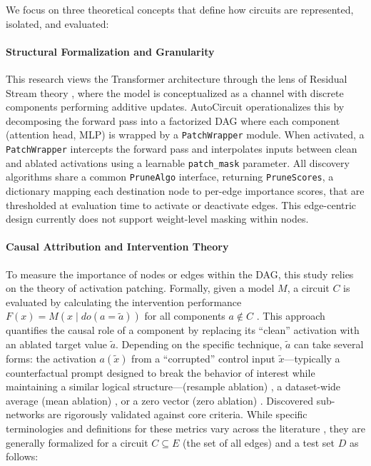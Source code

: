 \documentclass[
    IMRAD=false,
	english,
	ruledheaders=section, %
	class=report, %
	thesis={type=bachelor}, %
	accentcolor=9c, %
	custommargins=false,%
	marginpar=false,%
	parskip=half,%
	fontsize=11pt,%
]{tudapub}
\begin{document}

We focus on three theoretical concepts that define how circuits are represented, isolated, and evaluated:

\paragraph{Structural Formalization and Granularity} This research views the Transformer architecture through the lens of Residual Stream theory \citep{elhage2021mathematical}, where the model is conceptualized as a channel with discrete components performing additive updates. AutoCircuit \citep{miller2024transformer} operationalizes this by decomposing the forward pass into a factorized DAG where each component (attention head, MLP) is wrapped by a \texttt{PatchWrapper} module. When activated, a \texttt{PatchWrapper} intercepts the forward pass and interpolates inputs between clean and ablated activations using a learnable \texttt{patch\_mask} parameter. All discovery algorithms share a common \texttt{PruneAlgo} interface, returning \texttt{PruneScores}, a dictionary mapping each destination node to per-edge importance scores, that are thresholded at evaluation time to activate or deactivate edges. This edge-centric design currently does not support weight-level masking within nodes.

\paragraph{Causal Attribution and Intervention Theory} To measure the importance of nodes or edges within the DAG, this study relies on the theory of activation patching. Formally, given a model $M$, a circuit $C$ is evaluated by calculating the intervention performance $F(x) = M(x \mid do(a = \tilde{a}))$ for all components $a \notin C$ \citep{miller2024transformer}. This approach quantifies the causal role of a component by replacing its ``clean'' activation with an ablated target value $\tilde{a}$. Depending on the specific technique, $\tilde{a}$ can take several forms: the activation $a(\tilde{x})$ from a ``corrupted'' control input $\tilde{x}$—typically a counterfactual prompt designed to break the behavior of interest while maintaining a similar logical structure---(resample ablation) \citep{meng2022locating}, a dataset-wide average (mean ablation) \citep{wang2023interpretability}, or a zero vector (zero ablation) \citep{olsson2022context}. Discovered sub-networks are rigorously validated against core criteria. While specific terminologies and definitions for these metrics vary across the literature \citep{wang2023interpretability, yu-etal-2025-sheaf, acdc}, they are generally formalized for a circuit $C \subseteq E$ (the set of all edges) and a test set $D$ as follows:
\end{document}
